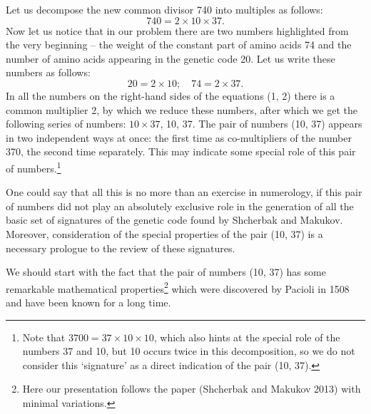 \documentclass[12pt]{article}
\begin{document}
Let us decompose the new common divisor 740 into multiples as follows:
\begin{equation}
740 = 2 \times 10 \times 37.
\end{equation}
Now let us notice that in our problem there are two numbers highlighted from the very beginning -- the weight of the constant part of amino acids 74 and the number of amino acids appearing in the genetic code 20. Let us write these numbers as follows:
\begin{equation}
20 = 2 \times 10; \quad 74 = 2 \times 37.
\end{equation}
In all the numbers on the right-hand sides of the equations (1, 2) there is a common multiplier 2, by which we reduce these numbers, after which we get the following series of numbers: $10 \times 37$, 10, 37. The pair of numbers (10, 37) appears in two independent ways at once: the first time as co-multipliers of the number 370, the second time separately. This may indicate some special role of this pair of numbers.\footnote{Note that $3700 = 37 \times 10 \times 10$, which also hints at the special role of the numbers 37 and 10, but 10 occurs twice in this decomposition, so we do not consider this `signature' as a direct indication of the pair (10, 37).}

One could say that all this is no more than an exercise in numerology, if this pair of numbers did not play an absolutely exclusive role in the generation of all the basic set of signatures of the genetic code found by Shcherbak and Makukov. Moreover, consideration of the special properties of the pair (10, 37) is a necessary prologue to the review of these signatures.

We should start with the fact that the pair of numbers (10, 37) has some remarkable mathematical properties\footnote{Here our presentation follows the paper (Shcherbak and Makukov 2013) with minimal variations.} which were discovered by Pacioli in 1508 and have been known for a long time.
\end{document}
